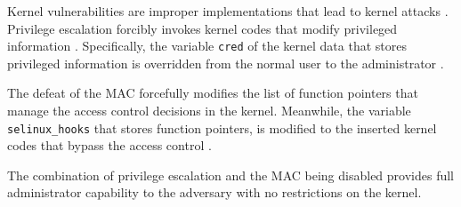 Kernel vulnerabilities are improper implementations that lead to kernel
attacks \cite{chen11linux}.
Privilege escalation forcibly invokes kernel codes that modify privileged
information \cite{CVE-2016-4997,CVE-2016-9793,CVE-2017-1000112}. 
Specifically, the variable \verb|cred| of the kernel data that stores privileged
information is overridden from the normal user to the administrator
\cite{CVE-2017-16995}.

The defeat of the MAC forcefully modifies the list of function pointers that
manage the access control decisions in the kernel. Meanwhile, the variable
\verb|selinux_hooks| that stores function pointers, is modified to the inserted kernel 
codes that bypass the access control \cite{nexus5exploit,grsecurity}.

The combination of privilege escalation and the MAC being disabled provides full
administrator capability to the adversary with no restrictions on the kernel.



